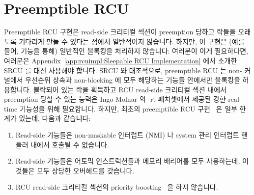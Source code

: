 
\section{Preemptible RCU}
\label{app:rcuimpl:Preemptible RCU}

Preemptible RCU 구현은 read-side 크리티컬 섹션이 preemption 당하고 락들을
오래도록 기다리게 만들 수 있다는 점에서 일반적이지 않습니다.
하지만, 이 구현은 (예를 들어,  기능을 통해) 일반적인 블록킹을
처리하지 않습니다:
여러분이 이게 필요하다면, 여러분은
Appendix~\ref{app:rcuimpl:Sleepable RCU Implementation}
에서 소개한 SRCU 를 대신 사용해야 합니다.
SRCU 와 대조적으로, preemptible RCU 는 non- 커널에서
우선순위 상속과 non-blocking 에 모두 해당하는 기능들 안에서만 블록킹을
허용합니다.
블락되어 있는 락을 획득하고 RCU read-side 크리티컬 섹션 내에서 preemption 당할
수 있는 능력은 Ingo Molnar 의 -rt 패치셋에서 제공된 강한 real-time 기능성을
위해 필요합니다.
하지만, 최초의 preemptible RCU 구현~\cite{PaulMcKenney2005d} 은 일부 한계가
있는데, 다음과 같습니다:

\begin{enumerate}
\item	Read-side 기능들은 non-maskable 인터럽트 (NMI) 나 system 관리 인터럽트
	핸들러 내에서 호출될 수 없습니다.
\item	Read-side 기능들은 어토믹 인스트럭션들과 메모리 배리어를 모두
	사용하는데, 이것들은 모두 상당한 오버헤드를 갖습니다.
\item	RCU read-side 크리티컬 섹션의 priority
	boosting~\cite{PaulEMcKenney2007BoostRCU} 을 하지 않습니다.

\end{enumerate}

